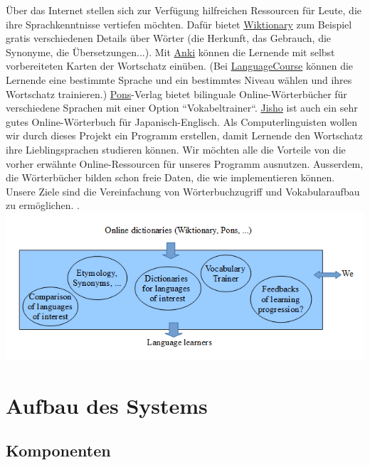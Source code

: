 \documentclass[a4paper]{article}
\begin{document}
Über das Internet stellen sich zur Verfügung hilfreichen Ressourcen für Leute, die ihre Sprachkenntnisse vertiefen möchten. Dafür bietet \href{https://www.wiktionary.org/}{Wiktionary} zum Beispiel gratis verschiedenen Details über Wörter (die Herkunft, das Gebrauch, die Synonyme, die Übersetzungen...). Mit \href{http://ankisrs.net/}{Anki} können die Lernende mit selbst vorbereiteten Karten der Wortschatz einüben. (Bei \href{http://www.languagecourse.net/vocabulary-trainer.php}{LanguageCourse} können die Lernende eine bestimmte Sprache und ein bestimmtes Niveau wählen und ihres Wortschatz trainieren.) \href{http://en.pons.com/translate}{Pons}-Verlag bietet bilinguale Online-Wörterbücher für verschiedene Sprachen mit einer Option ``Vokabeltrainer“.  \href{http://jisho.org/}{Jisho} ist auch ein sehr gutes Online-Wörterbuch für Japanisch-Englisch. Als Computerlinguisten wollen wir durch dieses Projekt ein Programm erstellen, damit Lernende den Wortschatz ihre Lieblingsprachen studieren können. Wir möchten alle die Vorteile von die vorher erwähnte Online-Ressourcen für unseres Programm ausnutzen. Ausserdem, die Wörterbücher bilden schon freie Daten, die wie implementieren können. Unsere Ziele sind die Vereinfachung von Wörterbuchzugriff und Vokabularaufbau zu ermöglichen. 
.
\\
\includegraphics[scale=0.75]{UseCaseUML}
\\

\section{Aufbau des Systems}

\subsection{Komponenten}
\end{document}
